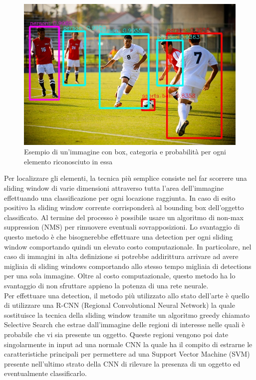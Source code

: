 \begin{figure}[H]
	\centering
	\includegraphics[width=0.7\linewidth]{images/esempio-detection.jpg}
	\caption{Esempio di un'immagine con box, categoria e probabilità per ogni elemento riconosciuto in essa}
	\label{Esempio di detection ideale}
\end{figure}
Per localizzare gli elementi, la tecnica più semplice consiste nel far scorrere una sliding window di varie dimensioni attraverso tutta l'area dell'immagine effettuando una classificazione per ogni locazione raggiunta. In caso di esito positivo la sliding window corrente corrisponderà al bounding box dell'oggetto classificato. Al termine del processo è possibile usare un algoritmo di non-max suppression (NMS) per rimuovere eventuali sovrapposizioni. Lo svantaggio di questo metodo è che bisognerebbe effettuare una detection per ogni sliding window comportando quindi un elevato costo computazionale. In particolare, nel caso di immagini in alta definizione si potrebbe addirittura arrivare ad avere migliaia di sliding windows comportando allo stesso tempo migliaia di detections per una sola immagine. Oltre al costo computazionale, questo metodo ha lo svantaggio di non sfruttare appieno la potenza di una rete neurale.\\
Per effettuare una detection, il metodo più utilizzato allo stato dell'arte è quello di utilizzare una R-CNN (Regional Convolutional Neural Network)\cite{RCNN} la quale sostituisce la tecnica della sliding window tramite un algoritmo greedy chiamato Selective Search che estrae dall'immagine delle regioni di interesse nelle quali è probabile che vi sia presente un oggetto. Queste regioni vengono poi date singolarmente in input ad una normale CNN la quale ha il compito di estrarne le caratteristiche principali per permettere ad una Support Vector Machine (SVM) presente nell'ultimo strato della CNN di rilevare la presenza di un oggetto ed eventualmente classificarlo.\\
